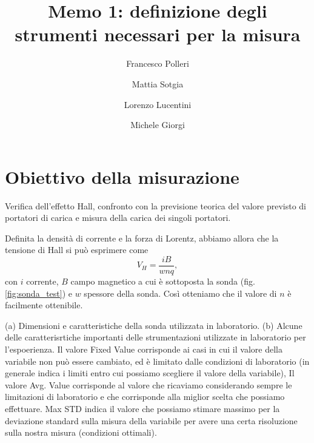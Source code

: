 \documentclass[fleqn,varvw]{memo}
\begin{document}
\title{Memo 1: definizione degli strumenti necessari per la misura}

\author{Francesco Polleri}
\author{Mattia Sotgia}


\author{Lorenzo Lucentini}
\author{Michele Giorgi}

\revised{\today}

\begin{abstract}

\end{abstract}
\maketitle

\section{Obiettivo della misurazione}

Verifica dell'effetto Hall, confronto con la previsione teorica del valore previsto di portatori di carica e misura della carica dei singoli portatori.

Definita la densità di corrente e la forza di Lorentz, abbiamo allora che la tensione di Hall si può esprimere come \begin{equation}
    V_H = \frac{iB}{wnq},
\end{equation} con $i$ corrente, $B$ campo magnetico a cui è sottoposta la sonda (fig. \ref{fig:sonda_test}) e $w$ spessore della sonda. Così otteniamo che il valore di $n$ è facilmente ottenibile. 

\twocolumngrid
\begin{table}
    \subfloat[][]{\label{tab:sonda}}\hspace{5mm}
    \subfloat[][]{\label{tab:min_max_values}}

    \caption{(a) Dimensioni e caratteristiche della sonda utilizzata in laboratorio. (b) Alcune delle caratterisrtiche importanti delle strumentazioni utilizzate in laboratorio per l'espoerienza. Il valore Fixed Value corrisponde ai casi in cui il valore della variabile non può essere cambiato, ed è limitato dalle condizioni di laboratorio (in generale indica i limiti entro cui possiamo scegliere il valore della variabile), Il valore Avg. Value corrisponde al valore che ricaviamo considerando sempre le limitazioni di laboratorio e che corrisponde alla miglior scelta che possiamo effettuare. Max STD indica il valore che possiamo stimare massimo per la deviazione standard sulla misura della variabile per avere una certa risoluzione sulla nostra misura (condizioni ottimali).}
\end{table}
\onecolumngrid
\end{document}
